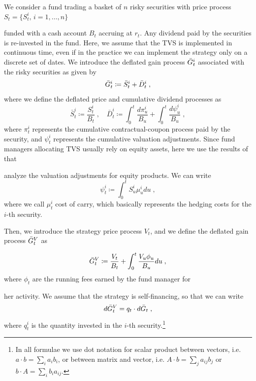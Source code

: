 \documentclass[runningheads]{m2ef}
\newcommand\soutpars[1]{\let\helpcmd\sout\parhelp#1\par\relax\relax}
\newcommand{\change}[1]{{\color{red} {#1}}}%
\newcommand{\remove}[1]{{\color{red} \soutpars{{#1}}}}%
\begin{document}
We consider a fund trading a basket of $n$ risky securities with price process \change{$S_t = \{S_t^i, \, i=1,\dots,n\}$} \remove{$S_t = (S_t^i, \, i=1,\dots,n)$} funded with a cash account $B_t$ accruing at $r_t$. Any dividend paid by the securities is re-invested in the fund. Here, we assume that the TVS is implemented in continuous time, even if in the practice we can implement the strategy only on a discrete set of dates. We introduce the deflated gain process $\Bar{G}_t^i$ associated with the risky securities as given by
\begin{equation}
    \Bar{G}_t^i \coloneqq \Bar{S}_t^i + \Bar{D}_t^i \; ,
\end{equation}
where we define the deflated price and cumulative dividend processes as 
\begin{equation}
    \bar{S}_t^i \coloneqq \frac{S_t^i}{B_t} \; , \quad \bar{D}^i_t \coloneqq \int_0^t\frac{d\pi_u^i}{B_u} + \int_0^t\frac{d\psi_u^i}{B_u} \; ,
\end{equation}
where $\pi^i_t$ represents the cumulative contractual-coupon process paid by the security, and $\psi_t^i$ represents the cumulative valuation adjustments.
Since fund managers allocating TVS usually rely on equity assets, here we use the results of \cite{Gabrielli2020} that \remove{analyzes} \change{analyze} the valuation adjustments for equity products. We can write 
\begin{equation}
    \psi_t^i \coloneqq \int_0^t S_u^i\mu_u^i du \; ,
\label{eq:XVA_equity}\end{equation}
where we call $\mu_t^i$ cost of carry, which basically represents the hedging costs for the $i$-th security.

Then, we introduce the strategy price process $V_t$, and we define the deflated gain process $\Bar{G}_t^V$ as \remove{given by}
\begin{equation}
    \Bar{G}_t^V \coloneqq \frac{V_t}{B_t} + \int_0^t\frac{V_u\phi_u}{B_u}du \; ,
\end{equation}
where $\phi_t$ are the running fees earned by the fund manager for \remove{his} \change{her} activity. We assume that the strategy is self-financing, so that we can write
\begin{equation}
    d\Bar{G}_t^V = q_t \cdot d\bar{G}_t \; ,
\label{eq:self_financing}\end{equation}
where $q_t^i$ is the quantity invested in the $i$-th security.\footnote{In all formulae we use dot notation for scalar product between vectors, i.e. $a \cdot b = \sum_i a_i b_i$, or between matrix and vector, i.e. $A \cdot b = \sum_j a_{ij}b_j$ or $b \cdot A = \sum_i b_i a_{ij}$.}
\end{document}
